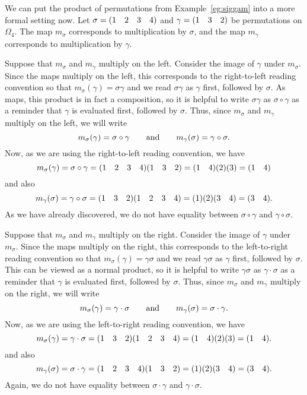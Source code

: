 \begin{example}
    We can put the product of permutations from Example~\ref{eg:siggam} into a more formal setting now. Let $\sigma = (1 \quad 2 \quad 3 \quad 4)$ and $\gamma = (1 \quad 3 \quad 2)$ be permutations on $\Omega_{4}$. The map $m_{\sigma}$ corresponds to multiplication by $\sigma$, and the map $m_{\gamma}$ corresponds to multiplication by $\gamma$.

     Suppose that $m_{\sigma}$ and $m_{\gamma}$ multiply on the left. Consider the image of $\gamma$ under $m_{\sigma}$. Since the maps multiply on the left, this corresponds to the right-to-left reading convention so that $m_{\sigma}(\gamma) = \sigma\gamma$ and we read $\sigma\gamma$ as $\gamma$ first, followed by $\sigma$. As maps, this product is in fact a composition, so it is helpful to write $\sigma\gamma$ as $\sigma\circ\gamma$ as a reminder that $\gamma$ is evaluated first, followed by $\sigma$. Thus, since $m_{\sigma}$ and $m_{\gamma}$ multiply on the left, we will write
    \[
    m_{\sigma}(\gamma) = \sigma\circ\gamma \hspace{20pt}\text{and}\hspace{20pt} m_{\gamma}(\sigma) = \gamma\circ\sigma.
    \]
    Now, as we are using the right-to-left reading convention, we have
    \[
    m_{\sigma}(\gamma) = \sigma \circ \gamma = (1 \quad 2 \quad 3 \quad 4)(1 \quad 3 \quad 2) = (1 \quad 4)(2)(3) = (1 \quad 4)
    \]
    and also
    \[
    m_{\gamma}(\sigma) = \gamma \circ \sigma = (1 \quad 3 \quad 2)(1 \quad 2 \quad 3 \quad 4) = (1)(2)(3 \quad 4) = (3 \quad 4).
    \]
    As we have already discovered, we do not have equality between $\sigma \circ \gamma$ and $\gamma \circ \sigma$.

     Suppose that $m_{\sigma}$ and $m_{\gamma}$ multiply on the right. Consider the image of $\gamma$ under $m_{\sigma}$. Since the maps multiply on the right, this corresponds to the left-to-right reading convention so that $m_{\sigma}(\gamma) = \gamma\sigma$ and we read $\gamma\sigma$ as $\gamma$ first, followed by $\sigma$. This can be viewed as a normal product, so it is helpful to write $\gamma\sigma$ as $\gamma\cdot\sigma$ as a reminder that $\gamma$ is evaluated first, followed by $\sigma$. Thus, since $m_{\sigma}$ and $m_{\gamma}$ multiply on the right, we will write
    \[
    m_{\sigma}(\gamma) = \gamma\cdot\sigma \hspace{20pt}\text{and}\hspace{20pt} m_{\gamma}(\sigma) = \sigma\cdot\gamma.
    \]
    Now, as we are using the left-to-right reading convention, we have
    \[
    m_{\sigma}(\gamma) = \gamma \cdot \sigma = (1 \quad 3 \quad 2)(1 \quad 2 \quad 3 \quad 4) = (1 \quad 4)(2)(3) = (1 \quad 4).
    \]
    and also
    \[
    m_{\gamma}(\sigma) = \sigma \cdot \gamma = (1 \quad 2 \quad 3 \quad 4)(1 \quad 3 \quad 2) = (1)(2)(3 \quad 4) = (3 \quad 4).
    \]
    Again, we do not have equality between $\sigma \cdot \gamma$ and $\gamma \cdot \sigma$.


\end{example}
